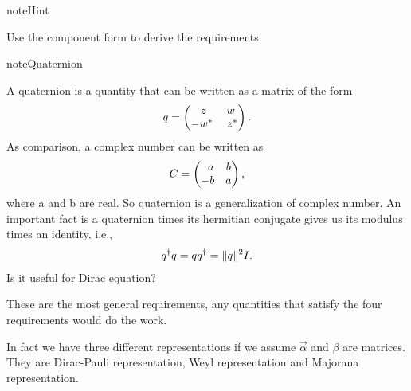 \documentclass[letterpaper,12pt,english]{sphinxmanual}
\begin{document}
\begin{notice}{note}{Hint}

Use the component form to derive the requirements.
\end{notice}

\begin{notice}{note}{Quaternion}

A quaternion is a quantity that can be written as a matrix of the form
\begin{gather}
\begin{split}q = \begin{pmatrix}\;z & w \\ -w^* & \;z^*\end{pmatrix}.\end{split}\notag
\end{gather}
As comparison, a complex number can be written as
\begin{gather}
\begin{split}C = \begin{pmatrix}\;\; a &   b  \\- b &  a
\end{pmatrix},\end{split}\notag
\end{gather}
where a and b are real. So quaternion is a generalization of complex number. An important fact is a quaternion times its hermitian conjugate gives us its modulus times an identity, i.e.,
\begin{gather}
\begin{split}q^\dagger q= q q^\dagger = \| q \|^2 I.\end{split}\notag
\end{gather}
Is it useful for Dirac equation?
\end{notice}

These are the most general requirements, any quantities that satisfy the four requirements would do the work.

In fact we have three different representations if we assume \(\vec\alpha\) and \(\beta\) are matrices. They are Dirac-Pauli representation, Weyl representation and Majorana representation.
\end{document}
